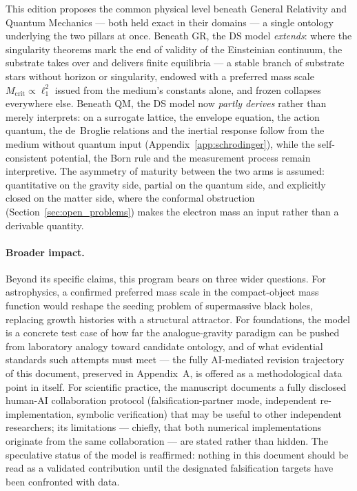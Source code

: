 \documentclass[11pt,a4paper]{article}
\theoremstyle{plain}
\theoremstyle{remark}
\begin{document}
This edition proposes the common physical level beneath General Relativity and Quantum Mechanics --- both held exact in their domains --- a single ontology underlying the two pillars at once. Beneath GR, the DS model \emph{extends}: where the singularity theorems mark the end of validity of the Einsteinian continuum, the substrate takes over and delivers finite equilibria --- a stable branch of substrate stars without horizon or singularity, endowed with a preferred mass scale $M_{\text{crit}} \propto \ell_1^2$ issued from the medium's constants alone, and frozen collapses everywhere else. Beneath QM, the DS model now \emph{partly derives} rather than merely interprets: on a surrogate lattice, the envelope equation, the action quantum, the de~Broglie relations and the inertial response follow from the medium without quantum input (Appendix~\ref{app:schrodinger}), while the self-consistent potential, the Born rule and the measurement process remain interpretive. The asymmetry of maturity between the two arms is assumed: quantitative on the gravity side, partial on the quantum side, and explicitly closed on the matter side, where the conformal obstruction (Section~\ref{sec:open_problems}) makes the electron mass an input rather than a derivable quantity.

\paragraph{Broader impact.} Beyond its specific claims, this program bears on three wider questions. For astrophysics, a confirmed preferred mass scale in the compact-object mass function would reshape the seeding problem of supermassive black holes, replacing growth histories with a structural attractor. For foundations, the model is a concrete test case of how far the analogue-gravity paradigm \cite{barcelo, volovik} can be pushed from laboratory analogy toward candidate ontology, and of what evidential standards such attempts must meet --- the fully AI-mediated revision trajectory of this document, preserved in Appendix~A, is offered as a methodological data point in itself. For scientific practice, the manuscript documents a fully disclosed human-AI collaboration protocol (falsification-partner mode, independent re-implementation, symbolic verification) that may be useful to other independent researchers; its limitations --- chiefly, that both numerical implementations originate from the same collaboration --- are stated rather than hidden. The speculative status of the model is reaffirmed: nothing in this document should be read as a validated contribution until the designated falsification targets have been confronted with data.
\end{document}
